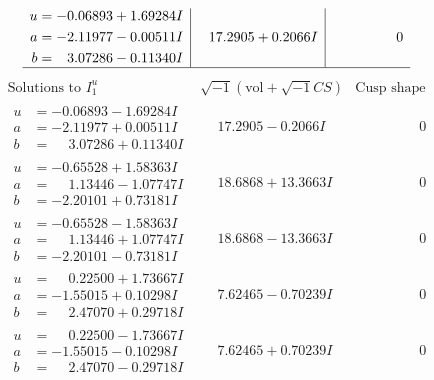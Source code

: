 \documentclass[1p]{elsarticle_modified}
\theoremstyle{definition}
\newcommand{\I}{\sqrt{-1}}
\begin{document}
$$\begin{array}{c|c|c}
\begin{aligned}
u &= -0.06893 + 1.69284 I \\
a &= -2.11977 - 0.00511 I \\
b &= \phantom{-}3.07286 - 0.11340 I\end{aligned}
 & \phantom{-}17.2905 + 0.2066 I & \phantom{-0.000000 } 0\\
 \hline 
 \end{array}$$\newpage$$\begin{array}{c|c|c}  
\text{Solutions to }I^u_{1}& \I (\text{vol} + \sqrt{-1}CS) & \text{Cusp shape}\\
 \hline 
\begin{aligned}
u &= -0.06893 - 1.69284 I \\
a &= -2.11977 + 0.00511 I \\
b &= \phantom{-}3.07286 + 0.11340 I\end{aligned}
 & \phantom{-}17.2905 - 0.2066 I & \phantom{-0.000000 } 0 \\ \hline\begin{aligned}
u &= -0.65528 + 1.58363 I \\
a &= \phantom{-}1.13446 - 1.07747 I \\
b &= -2.20101 + 0.73181 I\end{aligned}
 & \phantom{-}18.6868 + 13.3663 I & \phantom{-0.000000 } 0 \\ \hline\begin{aligned}
u &= -0.65528 - 1.58363 I \\
a &= \phantom{-}1.13446 + 1.07747 I \\
b &= -2.20101 - 0.73181 I\end{aligned}
 & \phantom{-}18.6868 - 13.3663 I & \phantom{-0.000000 } 0 \\ \hline\begin{aligned}
u &= \phantom{-}0.22500 + 1.73667 I \\
a &= -1.55015 + 0.10298 I \\
b &= \phantom{-}2.47070 + 0.29718 I\end{aligned}
 & \phantom{-}7.62465 - 0.70239 I & \phantom{-0.000000 } 0 \\ \hline\begin{aligned}
u &= \phantom{-}0.22500 - 1.73667 I \\
a &= -1.55015 - 0.10298 I \\
b &= \phantom{-}2.47070 - 0.29718 I\end{aligned}
 & \phantom{-}7.62465 + 0.70239 I & \phantom{-0.000000 } 0 \\ \hline\begin{aligned}

\end{aligned}
\end{array}$$
\end{document}
